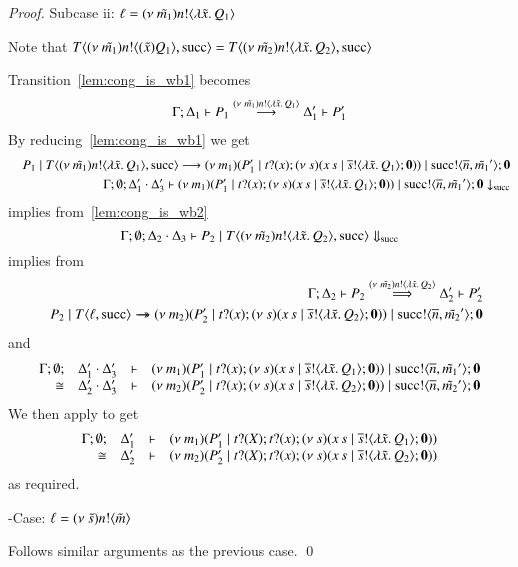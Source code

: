 \begin{proof}
	\noi Subcase ii: $\ell = (\nu\ \tilde{m_1}) n ! \langle \lambda \tilde{x}.\,Q_1 \rangle$

	\noi Note that $T\langle (\nu\ \tilde{m_1}) n ! \langle (\tilde{x}) Q_1 \rangle, \textrm{succ} \rangle = T\langle (\nu\ \tilde{m_2}) n ! \langle \lambda \tilde{x}.\,Q_2 \rangle, \textrm{succ} \rangle$

	\noi Transition~\ref{lem:cong_is_wb1} becomes
%
	\begin{eqnarray}
		\Gamma; \Delta_1 \vdash P_1 \stackrel{(\nu\ \tilde{m_1}) n ! \langle \lambda \tilde{x}.\,Q_1 \rangle}{\longrightarrow} \Delta_1' \vdash P_1'
		\label{lem:cong_is_wb3}
	\end{eqnarray}
%
	\noi By reducing~\ref{lem:cong_is_wb1} we get
%
	\begin{eqnarray*}
		&& P_1 \;|\; T\langle (\nu\ \tilde{m_1}) n ! \langle \lambda \tilde{x}.\,Q_1 \rangle, \textrm{succ} \rangle
		\longrightarrow
		(\nu\ m_1)(P_1' \;|\; t ? (x) ; (\nu\ s)(x\,s \;|\; \overline{s} ! \langle \lambda \tilde{x}.\,Q_1 \rangle ; \mathbf{0})) \;|\; \textrm{succ} ! \langle \overline{n}, \tilde{m_1}' \rangle ; \mathbf{0} \\
		&& \Gamma; \emptyset; \Delta_1' \cdot \Delta_3' \vdash (\nu\ m_1)(P_1' \;|\; t ? (x) ; (\nu\ s)(x\,s \;|\; \overline{s} ! \langle \lambda \tilde{x}.\,Q_1 \rangle ; \mathbf{0})) \;|\; \textrm{succ} ! \langle \overline{n}, \tilde{m_1}' \rangle ; \mathbf{0} \downarrow_{\textrm{succ}}
	\end{eqnarray*}
%
	\noi implies from~\ref{lem:cong_is_wb2}
%
	\[
		\Gamma; \emptyset; \Delta_2 \cdot \Delta_3 \vdash P_2 \;|\; T\langle (\nu\ \tilde{m_2}) n ! \langle \lambda \tilde{x}.\,Q_2 \rangle, \textrm{succ} \rangle \Downarrow_{\textrm{succ}}
	\]
%
	\noi implies from 
%
	\begin{eqnarray}
		&& \Gamma; \Delta_2 \vdash P_2 \stackrel{(\nu\ \tilde{m_2}) n ! \langle \lambda \tilde{x}.\,Q_2 \rangle}{\Longrightarrow} \Delta_2' \vdash P_2'
		\label{lem:cong_is_wb4}\\
		&& P_2 \;|\; T \langle \ell, \textrm{succ} \rangle \rightarrow\!\!\!\!\!\rightarrow (\nu\ m_2)(P_2' \;|\; t ? (x) ; (\nu\ s)(x\,s \;|\; \overline{s} ! \langle \lambda \tilde{x}.\,Q_2 \rangle ; \mathbf{0})) \;|\; \textrm{succ} ! \langle \overline{n}, \tilde{m_2}' \rangle ; \mathbf{0} \nonumber
	\end{eqnarray}
%
	\noi and
%
	\[
		\begin{array}{rcll} \Gamma; \emptyset; &\Delta_1' \cdot \Delta_3'& \vdash& (\nu\ m_1)(P_1' \;|\; t ? (x) ; (\nu\ s)(x\,s \;|\; \overline{s} ! \langle \lambda \tilde{x}.\,Q_1 \rangle ; \mathbf{0})) \;|\; \textrm{succ} ! \langle \overline{n}, \tilde{m_1}' \rangle ; \mathbf{0}\\ \cong &\Delta_2' \cdot \Delta_3'& \vdash &  (\nu\ m_2)(P_2' \;|\; t ? (x) ; (\nu\ s)(x\,s \;|\; \overline{s} ! \langle \lambda \tilde{x}.\,Q_2 \rangle ; \mathbf{0})) \;|\; \textrm{succ} ! \langle \overline{n}, \tilde{m_2}' \rangle ; \mathbf{0} \end{array}
	\]
%
	\noi We then apply  to get
%
	\[
		\begin{array}{rcll} \Gamma; \emptyset; &\Delta_1'& \vdash& (\nu\ m_1)(P_1' \;|\; t ? (X) ; t ? (x) ; (\nu\ s)(x\,s \;|\; \overline{s} ! \langle \lambda \tilde{x}.\,Q_1 \rangle ; \mathbf{0}))\\ \cong &\Delta_2'& \vdash &  (\nu\ m_2)(P_2' \;|\; t ? (X) ; t ? (x) ; (\nu\ s)(x\,s \;|\; \overline{s} ! \langle \lambda \tilde{x}.\,Q_2 \rangle ; \mathbf{0})) \end{array}
	\]
%
	\noi as required.

	\noi -Case: $\ell = (\nu\ \tilde{s}) n ! \langle \tilde{m} \rangle$

	\noi Follows similar arguments as the previous case.
	\qed
\end{proof}

